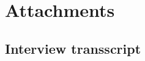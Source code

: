 \documentclass[paper=a4, fontsize=11pt,twoside]{scrartcl}	%
\begin{document}
\newpage

\section{Attachments}
\setcounter{section}{1}
\subsection{Interview transscript}







\end{document}
